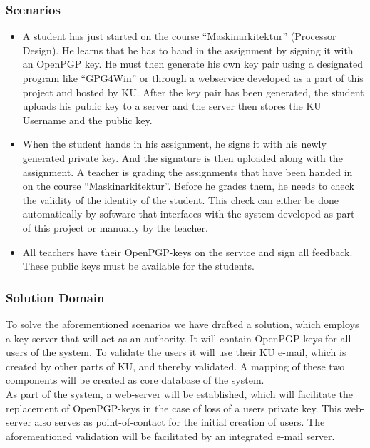 \documentclass[11pt,a4paper]{article}
\begin{document}
\subsubsection{Scenarios}
\begin{itemize}
\item A student has just started on the course ``Maskinarkitektur'' (Processor Design). He learns that he has to hand in the assignment by signing it with an OpenPGP key. He must then generate his own key pair using a designated program like ``GPG4Win'' or through a webservice developed as a part of this project and hosted by KU. After the key pair has been generated, the student uploads his public key to a server and the server then stores the KU Username and the public key.
\item When the student hands in his assignment, he signs it with his newly generated private key. And the signature is then uploaded along with the assignment. A teacher is grading the assignments that have been handed in on the course ``Maskinarkitektur''. Before he grades them, he needs to check the validity of the identity of the student. This check can either be done automatically by software that interfaces with the system developed as part of this project or manually by the teacher.
\item All teachers have their OpenPGP-keys on the service and sign all feedback. These public keys must be available for the students.
\end{itemize}

\subsubsection{Solution Domain}

To solve the aforementioned scenarios we have drafted a solution, which employs a key-server that will act as an authority. It will contain OpenPGP-keys for all users of the system. To validate the users it will use their KU e-mail, which is created by other parts of KU, and thereby validated. A mapping of these two components will be created as core database of the system.\\

As part of the system, a web-server will be established, which will facilitate the replacement of OpenPGP-keys in the case of loss of a users private key. This web-server also serves as point-of-contact for the initial creation of users. The aforementioned validation will be facilitated by an integrated e-mail server. \\
\end{document}
